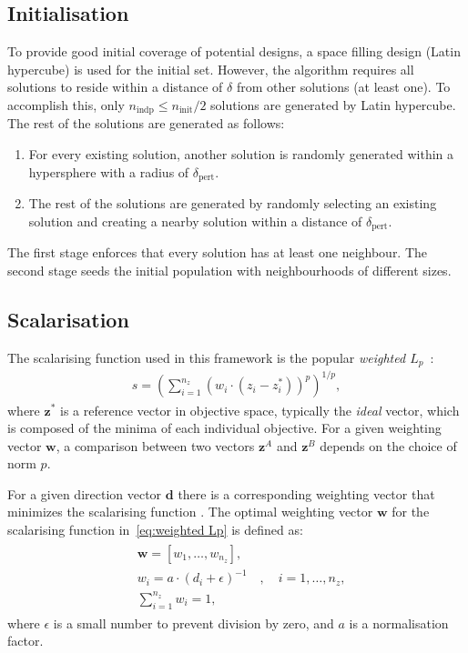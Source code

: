 \documentclass[10pt]{llncs}
\newcommand{\brs}[1]{\left[{#1}\right]} %
\newcommand{\brr}[1]{{\left({#1}\right)}} %
\newcommand{\vz}{\mathbf{z}} %
\newcommand{\vw}{\mathbf{w}} %
\newcommand{\vd}{\mathbf{d}} %
\begin{document}
\subsection{Initialisation}
\label{subsec:initialisation}
To provide good initial coverage of potential designs, a space filling design (Latin hypercube) is used for the initial set.
However, the algorithm requires all solutions to reside within a distance of $\delta$ from other solutions (at least one).
To accomplish this, only $n_\text{indp} \leq n_\text{init}/2$ solutions are generated by Latin hypercube.
The rest of the solutions are generated as follows:
\begin{enumerate}
\item For every existing solution, another solution is randomly generated within a hypersphere with a radius of $\delta_\text{pert}$.
\item The rest of the solutions are generated by randomly selecting an existing solution and creating a nearby solution within a distance of $\delta_\text{pert}$.
\end{enumerate}
The first stage enforces that every solution has at least one neighbour.
The second stage seeds the initial population with neighbourhoods of different sizes.

\subsection{Scalarisation}
\label{subsec:Scalarising}
The scalarising function used in this framework is the popular \emph{weighted $L_p$}~\cite{koski1987norm,Marler2004Survey}:
\begin{align}
\label{eq:weighted Lp}
	s = \brr{\sum_{i=1}^{n_z} \brr{w_i\cdot \brr{z_i-z_i^*}}^p}^{1/p},
\end{align}
where $\mathbf{z^*}$ is a reference vector in objective space, typically the \emph{ideal} vector, which is composed of the minima of each individual objective.
For a given weighting vector $\vw$, a comparison between two vectors $\vz^{A}$ and $\vz^{B}$ depends on the choice of norm $p$. 

For a given direction vector $\vd$ there is a corresponding weighting vector that minimizes the scalarising function \cite{giagkiozis2014generalized}. The optimal weighting vector $\mathbf{w}$ for the scalarising function in~\eqref{eq:weighted Lp} is defined as:
\begin{align}
\begin{split}
	&\mathbf{w}=\brs{w_1,\ldots,w_{n_z}},\\
	&w_i=a\cdot\brr{d_i+\epsilon}^{-1} \quad , \quad i=1,\ldots,n_z,\\
	&\sum_{i=1}^{n_z} w_i=1,
\end{split}
\end{align}
where $\epsilon$ is a small number to prevent division by zero, and $a$ is a normalisation factor.
\end{document}
